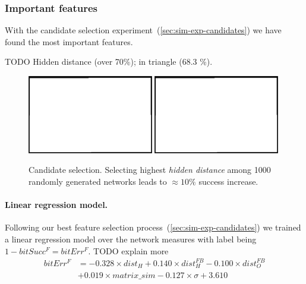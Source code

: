 
\subsubsection{Important features}
\label{sec:results-candidates} 

With the candidate selection experiment~(\ref{sec:sim-exp-candidates}) we have found the most important features. 

TODO Hidden distance (over 70\%); in triangle (68.3 \%). \\


\begin{figure}[H]
  \centering
  \includegraphics[width=0.49\textwidth]{img/placeholder.png}  %
  \includegraphics[width=0.49\textwidth]{img/placeholder.png}  %
  \caption{Candidate selection. Selecting highest \emph{hidden distance} among 1000 randomly generated networks leads to $\approx 10\%$ success increase.}
  \label{fig:results-candidates-tlr}
\end{figure}

\paragraph{Linear regression model.} 

Following our best feature selection process~(\ref{sec:sim-exp-candidates}) we trained a linear regression model over the network measures with label being $1-bitSucc^F = bitErr^F$. TODO explain more 
\begin{align} 
\label{eq:results-candidates-linear-regression} 
bitErr^F &= 
- 0.328 \times dist_{H}
+ 0.140 \times dist_{H}^{FB}
- 0.100 \times dist_{O}^{FB} \nonumber \\
&+ 0.019 \times matrix\_sim
- 0.127 \times \sigma
+ 3.610
\end{align} 

